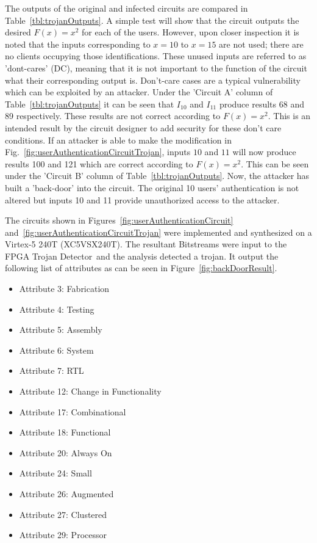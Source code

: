 \documentclass[conference]{IEEEtran}
\newcommand{\Name}{\acrshort{FPGA} Trojan Detector}
\newcommand{\NameNoPeriod}{\Name~}
\begin{document}
The outputs of the original and infected circuits are compared in Table~\ref{tbl:trojanOutputs}.
A simple test will show that the circuit outputs the desired $F(x) = x^2$ for each of the users.
However, upon closer inspection it is noted that the inputs corresponding to $x = 10$ to $x = 15$ are not used; there are no clients occupying those identifications.
These unused inputs are referred to as 'dont-cares' (DC), meaning that it is not important to the function of the circuit what their corresponding output is.
Don't-care cases are a typical vulnerability which can be exploited by an attacker.
Under the 'Circuit A' column of Table~\ref{tbl:trojanOutputs} it can be seen that $I_{10}$ and $I_{11}$ produce results 68 and 89 respectively.
These results are not correct according to $F(x) = x^2$.
This is an intended result by the circuit designer to add security for these don't care conditions.
If an attacker is able to make the modification in Fig.~\ref{fig:userAuthenticationCircuitTrojan}, inputs $10$ and $11$ will now produce results 100 and 121 which are correct according to $F(x) = x^2$.
This can be seen under the 'Circuit B' column of Table~\ref{tbl:trojanOutputs}.
Now, the attacker has built a 'back-door' into the circuit.
The original 10 users' authentication is not altered but inputs 10 and 11 provide unauthorized access to the attacker.

The circuits shown in Figures~\ref{fig:userAuthenticationCircuit} and~\ref{fig:userAuthenticationCircuitTrojan} were implemented and synthesized on a Virtex-5 240T  (XC5VSX240T).
The resultant \gls{Bitstream}s were input to the \NameNoPeriod and the analysis detected a trojan.
It output the following list of attributes as can be seen in Figure~\ref{fig:backDoorResult}.
\begin{itemize}
	\item Attribute 3: Fabrication
	\item Attribute 4: Testing
	\item Attribute 5: Assembly
	\item Attribute 6: System
	\item Attribute 7: RTL
	\item Attribute 12: Change in Functionality
	\item Attribute 17: Combinational
	\item Attribute 18: Functional
	\item Attribute 20: Always On
	\item Attribute 24: Small
	\item Attribute 26: Augmented
	\item Attribute 27: Clustered
	\item Attribute 29: Processor
\end{itemize}
\end{document}
